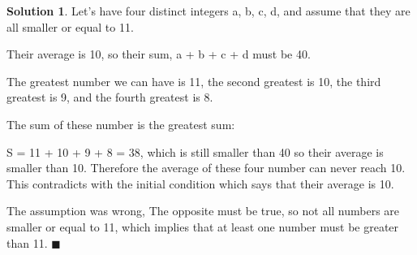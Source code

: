 \documentclass{article}
\theoremstyle{definition}
\newtheorem*{solution}{Solution}
\begin{document}
\begin{solution}
Let's have four distinct integers a, b, c, d, and assume that they are all smaller or equal to 11.

Their average is 10, so their sum, a + b + c + d must be 40.

The greatest number we can have is 11, the second greatest is 10, the third greatest is 9, and the fourth greatest is 8.

The sum of these number is the greatest sum:

S = 11 + 10 + 9 + 8 = 38, which is still smaller than 40 so their average is smaller than 10. Therefore the average of these four number can never reach 10. This contradicts with the initial condition which says that their average is 10.

The assumption was wrong, The opposite must be true, so not all numbers are smaller or equal to 11, which implies that at least one number must be greater than 11.  \(\blacksquare\)





\end{solution}
\end{document}
